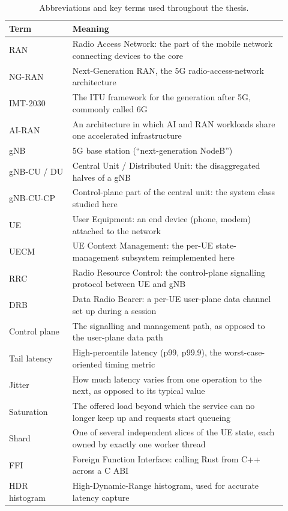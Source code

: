 \documentclass[english,twoside,openright,a4paper,censored,csm,software-track-2020]{HYthesisML}
\begin{document}
\begin{appendices}
\begin{table}[H]
\centering
\caption[Abbreviations and key terms]{Abbreviations and key terms used throughout the thesis.\label{tab:abbrev}}
\singlespacing
\footnotesize
\renewcommand{\arraystretch}{1.2}
\begin{tabular}{@{}p{0.21\linewidth} p{0.71\linewidth}@{}}
\hline\hline
Term & Meaning \\
\hline
RAN & Radio Access Network: the part of the mobile network connecting devices to the core \\
NG-RAN & Next-Generation RAN, the 5G radio-access-network architecture \\
IMT-2030 & The ITU framework for the generation after 5G, commonly called 6G \\
AI-RAN & An architecture in which AI and RAN workloads share one accelerated infrastructure \\
gNB & 5G base station (``next-generation NodeB'') \\
gNB-CU / DU & Central Unit / Distributed Unit: the disaggregated halves of a gNB \\
gNB-CU-CP & Control-plane part of the central unit: the system class studied here \\
UE & User Equipment: an end device (phone, modem) attached to the network \\
UECM & UE Context Management: the per-UE state-management subsystem reimplemented here \\
RRC & Radio Resource Control: the control-plane signalling protocol between UE and gNB \\
DRB & Data Radio Bearer: a per-UE user-plane data channel set up during a session \\
Control plane & The signalling and management path, as opposed to the user-plane data path \\
Tail latency & High-percentile latency (p99, p99.9), the worst-case-oriented timing metric \\
Jitter & How much latency varies from one operation to the next, as opposed to its typical value \\
Saturation & The offered load beyond which the service can no longer keep up and requests start queueing \\
Shard & One of several independent slices of the UE state, each owned by exactly one worker thread \\
FFI & Foreign Function Interface: calling Rust from C++ across a C ABI \\
HDR histogram & High-Dynamic-Range histogram, used for accurate latency capture \\
\hline
\end{tabular}
\end{table}


\end{appendices}
\end{document}

